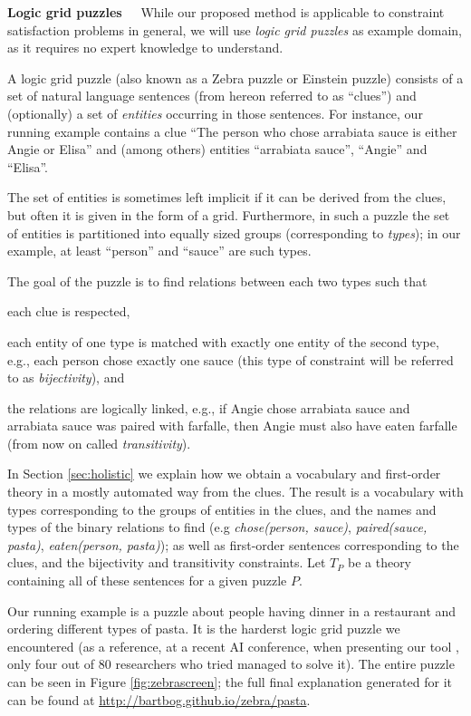 \textbf{Logic grid puzzles\ \ }
While our proposed method is applicable to constraint satisfaction problems in general, we will use \textit{logic grid puzzles} as example domain, as it requires no expert knowledge to understand.

A logic grid puzzle (also known as a Zebra puzzle or Einstein puzzle) consists of a set of natural language sentences (from hereon referred to as ``clues'') and (optionally) a set of \emph{entities} occurring in those sentences. 
For instance, our running example contains a clue ``The person who chose arrabiata sauce is either Angie or Elisa'' and (among others) entities ``arrabiata sauce'', ``Angie'' and ``Elisa''. 

The set of entities is sometimes left implicit if it can be derived from the clues, but often it is given in the form of a grid. Furthermore, in such a puzzle the set of entities is partitioned into equally sized groups (corresponding to \emph{types}); in our example, at least ``person'' and ``sauce'' are such types. 

The goal of the puzzle is to find relations between each two types such that
\begin{compactitem}
	\item each clue is respected, 
	\item each entity of one type is matched with exactly one entity of the second type, e.g., each person chose exactly one sauce (this type of constraint will be referred to as \emph{bijectivity}), and 
	\item the relations are logically linked, e.g., if Angie chose arrabiata sauce and arrabiata sauce was paired with farfalle, then Angie must also have eaten farfalle (from now on called \emph{transitivity}). 
\end{compactitem}
In Section \ref{sec:holistic} we explain how we obtain a vocabulary and first-order theory in a mostly automated way from the clues. The result is a vocabulary with types corresponding to the groups of entities in the clues, and the names and types of the binary relations to find (e.g \textit{chose(person, sauce)}, \textit{paired(sauce, pasta)}, \textit{eaten(person, pasta)});
as well as first-order sentences corresponding to the clues, and the bijectivity and transitivity constraints. Let $T_P$ be a theory containing all of these sentences for a given puzzle $P$.

Our running example is a puzzle about people having dinner in a restaurant and ordering different types of pasta. It is the harderst logic grid puzzle we encountered (as a reference, at a recent AI conference, when presenting our tool \cite{DBLP:conf/bnaic/ClaesBCGG19}, only four out of 80 researchers who tried managed to solve it).    
The entire puzzle can be seen in Figure \ref{fig:zebrascreen}; the full final explanation generated for it can be found at \url{http://bartbog.github.io/zebra/pasta}.

